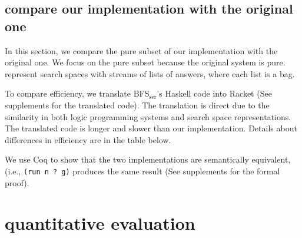 \documentclass[format=acmlarge, review=true, authordraft=true]{acmart}
\newcommand{\BFSser}[0]{BFS$_\textrm{ser}$}
\begin{document}
\subsection{compare our implementation with the original one}

In this section, we compare the pure subset of our implementation with the 
original one. We focus on the pure subset because the original system is pure.
\citeauthor{seres1999algebra} represent search spaces with streams of 
lists of answers, where each list is a bag.

To compare efficiency, we translate \BFSser{}'s Haskell code into Racket (See supplements for the translated code). The translation is direct 
due to the similarity in both logic programming systems and search space 
representations. The translated code is longer and slower than our 
implementation. Details about differences in efficiency are in the table below.

We use Coq to show that the two implementations are 
semantically equivalent, (i.e., \texttt{(run n ? g)} 
produces the same result (See supplements for the formal proof).

\section{quantitative evaluation}
\end{document}
